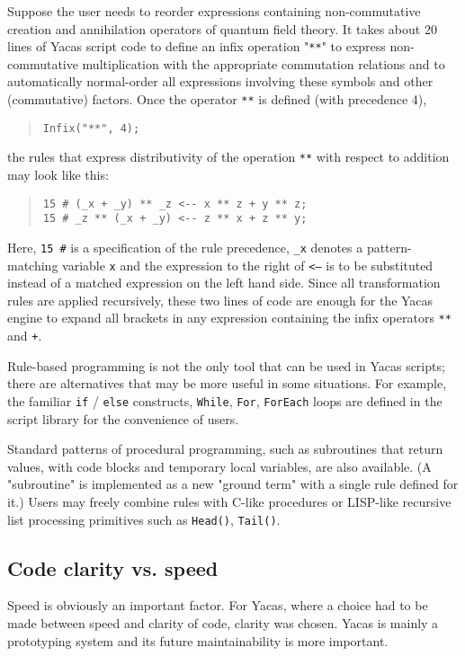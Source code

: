 \documentclass{llncs}
\begin{document}
Suppose the user needs to reorder expressions containing non-commutative creation and
annihilation operators of quantum field theory. It takes about 20 lines of
Yacas script code to define an infix operation "\texttt{**}" to express non-commutative
multiplication with the appropriate commutation relations and to automatically
normal-order all expressions involving these symbols and other (commutative)
factors. Once the operator \texttt{**} is defined (with precedence 4),
\begin{quote}\small\begin{verbatim}
Infix("**", 4);
\end{verbatim}\end{quote}
the rules that express distributivity of the operation \texttt{**} with
respect to addition may look like this:
\begin{quote}\small\begin{verbatim}
15 # (_x + _y) ** _z <-- x ** z + y ** z;
15 # _z ** (_x + _y) <-- z ** x + z ** y;
\end{verbatim}\end{quote}
Here, \verb|15 #| is a specification of the rule precedence, \verb|_x| denotes a
pattern-matching variable \texttt{x} and the expression to the right of \texttt{<--} is to be
substituted instead of a matched expression on the left hand side. Since all
transformation rules are applied recursively, these two lines of code are enough for the Yacas
engine to expand all brackets in any expression containing the infix operators
\texttt{**} and \texttt{+}.


Rule-based programming is not the only tool that can be used in Yacas scripts;
there are alternatives that may be more useful in some situations. For example,
the familiar \texttt{if} / \texttt{else} constructs, \texttt{While}, \texttt{For}, \texttt{ForEach} loops are
defined in the script library for the convenience of users.


Standard patterns of procedural programming, such as subroutines that
return values, with code blocks and temporary local variables, are also
available. (A "subroutine" is implemented as a new "ground term" with a single
rule defined for it.) Users may freely combine rules with C-like
procedures or LISP-like recursive list processing primitives such as \texttt{Head()},
\texttt{Tail()}.


\subsection*{Code clarity vs. speed}
Speed is obviously an important factor. For Yacas, where a choice had to be
made between speed and clarity of code, clarity was chosen. Yacas is mainly a
prototyping system and its future maintainability is more important.
\end{document}
